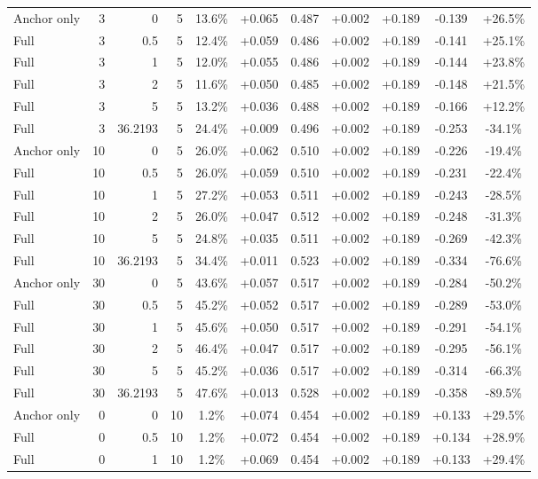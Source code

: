 \begin{table}[htbp]
\begin{tabular}{lrrrccccccc}
Anchor only & 3 & 0 & 5 & 13.6\% & +0.065 & 0.487 & +0.002 & +0.189 & -0.139 & +26.5\% \\
Full & 3 & 0.5 & 5 & 12.4\% & +0.059 & 0.486 & +0.002 & +0.189 & -0.141 & +25.1\% \\
Full & 3 & 1 & 5 & 12.0\% & +0.055 & 0.486 & +0.002 & +0.189 & -0.144 & +23.8\% \\
Full & 3 & 2 & 5 & 11.6\% & +0.050 & 0.485 & +0.002 & +0.189 & -0.148 & +21.5\% \\
Full & 3 & 5 & 5 & 13.2\% & +0.036 & 0.488 & +0.002 & +0.189 & -0.166 & +12.2\% \\
Full & 3 & 36.2193 & 5 & 24.4\% & +0.009 & 0.496 & +0.002 & +0.189 & -0.253 & -34.1\% \\
Anchor only & 10 & 0 & 5 & 26.0\% & +0.062 & 0.510 & +0.002 & +0.189 & -0.226 & -19.4\% \\
Full & 10 & 0.5 & 5 & 26.0\% & +0.059 & 0.510 & +0.002 & +0.189 & -0.231 & -22.4\% \\
Full & 10 & 1 & 5 & 27.2\% & +0.053 & 0.511 & +0.002 & +0.189 & -0.243 & -28.5\% \\
Full & 10 & 2 & 5 & 26.0\% & +0.047 & 0.512 & +0.002 & +0.189 & -0.248 & -31.3\% \\
Full & 10 & 5 & 5 & 24.8\% & +0.035 & 0.511 & +0.002 & +0.189 & -0.269 & -42.3\% \\
Full & 10 & 36.2193 & 5 & 34.4\% & +0.011 & 0.523 & +0.002 & +0.189 & -0.334 & -76.6\% \\
Anchor only & 30 & 0 & 5 & 43.6\% & +0.057 & 0.517 & +0.002 & +0.189 & -0.284 & -50.2\% \\
Full & 30 & 0.5 & 5 & 45.2\% & +0.052 & 0.517 & +0.002 & +0.189 & -0.289 & -53.0\% \\
Full & 30 & 1 & 5 & 45.6\% & +0.050 & 0.517 & +0.002 & +0.189 & -0.291 & -54.1\% \\
Full & 30 & 2 & 5 & 46.4\% & +0.047 & 0.517 & +0.002 & +0.189 & -0.295 & -56.1\% \\
Full & 30 & 5 & 5 & 45.2\% & +0.036 & 0.517 & +0.002 & +0.189 & -0.314 & -66.3\% \\
Full & 30 & 36.2193 & 5 & 47.6\% & +0.013 & 0.528 & +0.002 & +0.189 & -0.358 & -89.5\% \\
Anchor only & 0 & 0 & 10 & 1.2\% & +0.074 & 0.454 & +0.002 & +0.189 & +0.133 & +29.5\% \\
Full & 0 & 0.5 & 10 & 1.2\% & +0.072 & 0.454 & +0.002 & +0.189 & +0.134 & +28.9\% \\
Full & 0 & 1 & 10 & 1.2\% & +0.069 & 0.454 & +0.002 & +0.189 & +0.133 & +29.4\% \\

\end{tabular}
\end{table}
